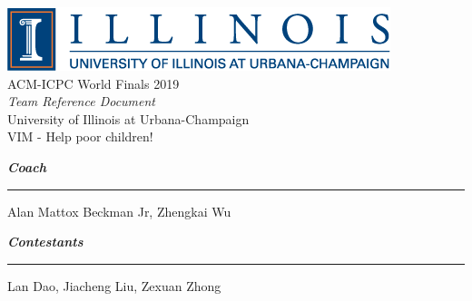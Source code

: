 \documentclass[10pt,landscape]{article}
\begin{document}
\begin{center}
    \includegraphics[scale=0.7]{logo.png} \\
    \vspace{15mm}
    {\Huge ACM-ICPC World Finals 2019} \\
    \vspace{10mm}
    {\LARGE \textit{Team Reference Document}} \\
    \vspace{10mm}
    {\LARGE University of Illinois at Urbana-Champaign} \\
    \vspace{5mm}
    {\LARGE VIM - Help poor children!} \\
    \vspace{30mm}
\end{center}

{\Large \textbf{\textit{Coach}}}
\vspace{5mm}
\hrule
\vspace{5mm}
{\Large Alan Mattox Beckman Jr, Zhengkai Wu} \\
\vspace{10mm}

{\Large \textbf{\textit{Contestants}}}
\vspace{5mm}
\hrule
\vspace{5mm}
{\Large Lan Dao, Jiacheng Liu, Zexuan Zhong}
\end{document}
